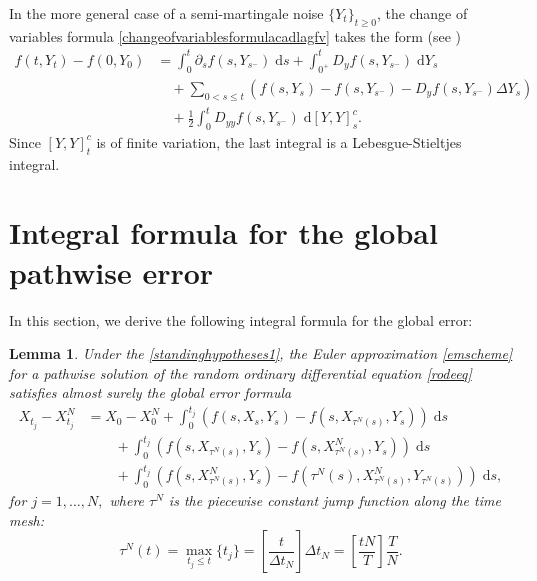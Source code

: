 \documentclass[reqno,12pt]{amsart}
\theoremstyle{plain} %
\newtheorem{lemma}{Lemma}[section]
\theoremstyle{definition} %
\begin{document}
In the more general case of a semi-martingale noise $\{Y_t\}_{t\geq 0}$, the change of variables formula \eqref{changeofvariablesformulacadlagfv} takes the form (see \cite[Theorems II.32 and II.33]{Protter2005})
\begin{equation}
    \label{changeofvariablesformulasemimartingale}
    \begin{aligned}
        f(t, Y_t) - f(0, Y_0) & = \int_0^t \partial_s f(s, Y_{s^-})\;\mathrm{d}s + \int_{0^+}^t D_y f(s, Y_{s^-}) \;\mathrm{d}Y_s \\
        & \quad + \sum_{0 < s \leq t} \left( f(s, Y_s) - f(s, Y_{s^{-}}) - D_y f(s, Y_{s^-})\Delta Y_s\right) \\
        & \quad + \frac{1}{2}\int_0^t D_{yy}f(s, Y_{s^-})\;\mathrm{d}[Y, Y]_s^c.
    \end{aligned}
\end{equation}
Since $[Y, Y]_t^c$ is of finite variation, the last integral is a Lebesgue-Stieltjes integral.

\section{Integral formula for the global pathwise error}

In this section, we derive the following integral formula for the global error:
\begin{lemma}
    \label{lemglobalerrorintegralformula}
    Under the \cref{standinghypotheses1}, the Euler approximation \eqref{emscheme} for a pathwise solution of the random ordinary differential equation \eqref{rodeeq} satisfies almost surely the global error formula
    \begin{equation}
        \label{globalerrorintegralformula}
        \begin{aligned}
            X_{t_j} - X_{t_j}^N & = X_0 - X_0^N + \int_0^{t_j} \left( f(s, X_s, Y_s) - f(s, X_{\tau^N(s)}, Y_s) \right)\;\mathrm{d}s  \\ 
            & \qquad + \int_{0}^{t_j} \left( f(s, X_{\tau^N(s)}, Y_s) - f(s, X_{\tau^N(s)}^N, Y_s) \right)\;\mathrm{d}s \\
            & \qquad + \int_0^{t_j} \left( f(s, X_{\tau^N(s)}^N, Y_s) - f(\tau^N(s), X_{\tau^N(s)}^N, Y_{\tau^N(s)}) \right)\;\mathrm{d}s,
        \end{aligned}
    \end{equation}
    for $j = 1, \ldots, N,$ where $\tau^N$ is the piecewise constant jump function along the time mesh:
    \begin{equation}
        \label{tauNt}
        \tau^N(t) = \max_{t_j \leq t}\{t_j\} = \left[\frac{t}{\Delta t_N}\right]\Delta t_N = \left[\frac{tN}{T}\right]\frac{T}{N}.
    \end{equation}
\end{lemma}
\end{document}
